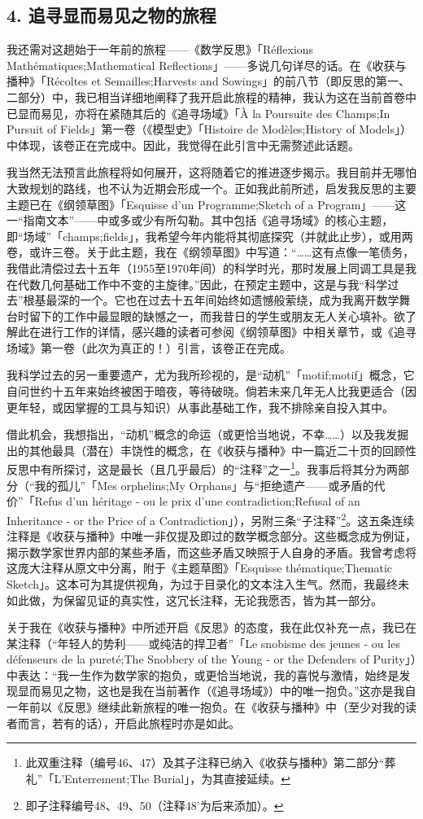 \subsection{4. 追寻显而易见之物的旅程}

我还需对这趟始于一年前的旅程——《数学反思》「Réflexions Mathématiques;Mathematical Reflections」——多说几句详尽的话。在《收获与播种》「Récoltes et Semailles;Harvests and Sowings」的前八节（即反思的第一、二部分）中，我已相当详细地阐释了我开启此旅程的精神，我认为这在当前首卷中已显而易见，亦将在紧随其后的《追寻场域》「À la Poursuite des Champs;In Pursuit of Fields」第一卷（《模型史》「Histoire de Modèles;History of Models」）中体现，该卷正在完成中。因此，我觉得在此引言中无需赘述此话题。

我当然无法预言此旅程将如何展开，这将随着它的推进逐步揭示。我目前并无哪怕大致规划的路线，也不认为近期会形成一个。正如我此前所述，启发我反思的主要主题已在《纲领草图》「Esquisse d'un Programme;Sketch of a Program」——这一“指南文本”——中或多或少有所勾勒。其中包括《追寻场域》的核心主题，即“场域”「champs;fields」，我希望今年内能将其彻底探究（并就此止步），或用两卷，或许三卷。关于此主题，我在《纲领草图》中写道：“……这有点像一笔债务，我借此清偿过去十五年（1955至1970年间）的科学时光，那时发展上同调工具是我在代数几何基础工作中不变的主旋律。”因此，在预定主题中，这是与我“科学过去”根基最深的一个。它也在过去十五年间始终如遗憾般萦绕，成为我离开数学舞台时留下的工作中最显眼的缺憾之一，而我昔日的学生或朋友无人关心填补。欲了解此在进行工作的详情，感兴趣的读者可参阅《纲领草图》中相关章节，或《追寻场域》第一卷（此次为真正的！）引言，该卷正在完成。

我科学过去的另一重要遗产，尤为我所珍视的，是“动机”「motif;motif」概念，它自问世约十五年来始终被困于暗夜，等待破晓。倘若未来几年无人比我更适合（因更年轻，或因掌握的工具与知识）从事此基础工作，我不排除亲自投入其中。

借此机会，我想指出，“动机”概念的命运（或更恰当地说，不幸……）以及我发掘出的其他最具（潜在）丰饶性的概念，在《收获与播种》中一篇近二十页的回顾性反思中有所探讨，这是最长（且几乎最后）的“注释”之一\footnote{此双重注释（编号46、47）及其子注释已纳入《收获与播种》第二部分“葬礼”「L'Enterrement;The Burial」，为其直接延续。}。我事后将其分为两部分（“我的孤儿”「Mes orphelins;My Orphans」与“拒绝遗产——或矛盾的代价”「Refus d'un héritage - ou le prix d'une contradiction;Refusal of an Inheritance - or the Price of a Contradiction」），另附三条“子注释”\footnote{即子注释编号48、49、50（注释48'为后来添加）。}。这五条连续注释是《收获与播种》中唯一非仅提及即过的数学概念部分。这些概念成为例证，揭示数学家世界内部的某些矛盾，而这些矛盾又映照于人自身的矛盾。我曾考虑将这庞大注释从原文中分离，附于《主题草图》「Esquisse thématique;Thematic Sketch」。这本可为其提供视角，为过于目录化的文本注入生气。然而，我最终未如此做，为保留见证的真实性，这冗长注释，无论我愿否，皆为其一部分。

关于我在《收获与播种》中所述开启《反思》的态度，我在此仅补充一点，我已在某注释（“年轻人的势利——或纯洁的捍卫者”「Le snobisme des jeunes - ou les défenseurs de la pureté;The Snobbery of the Young - or the Defenders of Purity」）中表达：“我一生作为数学家的抱负，或更恰当地说，我的喜悦与激情，始终是发现显而易见之物，这也是我在当前著作（《追寻场域》）中的唯一抱负。”这亦是我自一年前以《反思》继续此新旅程的唯一抱负。在《收获与播种》中（至少对我的读者而言，若有的话），开启此旅程时亦是如此。